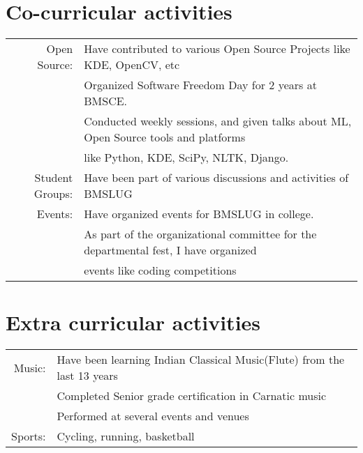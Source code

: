 \documentclass[a4paper,10pt]{article}
\begin{document}
\section{Co-curricular activities}
\begin{tabular}{rl}
Open Source:& Have contributed to various Open Source Projects like KDE, OpenCV, etc\\
&Organized Software Freedom Day for 2 years at BMSCE.\\
&Conducted weekly sessions, and given talks about ML, Open Source tools and platforms\\& like Python, KDE, SciPy, NLTK, Django.\\
Student Groups:& Have been part of various discussions and activities of BMSLUG\\
Events:& Have organized events for BMSLUG in college.\\
& As part of the organizational committee for the departmental fest, I have organized\\& events like coding competitions\\
\end{tabular}

\section{Extra curricular activities}
\begin{tabular}{rl}
Music:& Have been learning Indian Classical Music(Flute) from the last 13 years\\
& Completed Senior grade certification in Carnatic music\\
& Performed at several events and venues\\
Sports:& Cycling, running, basketball\\
\end{tabular}
\end{document}
